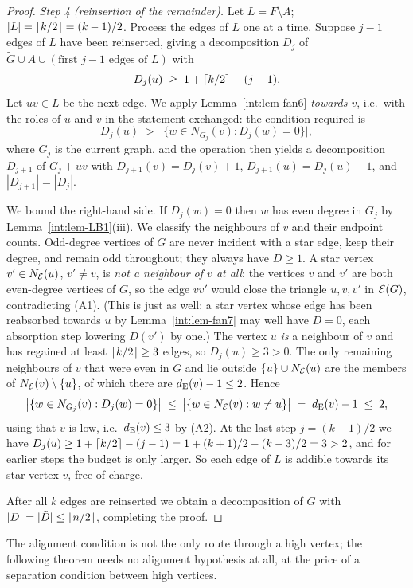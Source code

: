 \begin{proof}
\emph{Step 4 (reinsertion of the remainder).}
Let $L=F\setminus A$; $|L|=\left\lfloor k/2 \right\rfloor=(k-1)/2$. Process the edges of $L$
one at a time. Suppose $j-1$ edges of $L$ have been reinserted, giving a
decomposition $D_j$ of
$\tilde G\cup A\cup(\text{first } j-1 \text{ edges of } L)$ with
\[
D_j(u)\;\ge\;1+\left\lceil k/2 \right\rceil-(j-1).
\]
Let $uv\in L$ be the next edge. We apply Lemma~\ref{int:lem-fan6} \emph{towards
$v$}, i.e.\ with the roles of $u$ and $v$ in the statement exchanged: the
condition required is
\[
D_j(u)\;>\;\bigl|\{w\in N_{G_j}(v) : D_j(w)=0\}\bigr|,
\]
where $G_j$ is the current graph, and the operation then yields a
decomposition $D_{j+1}$ of $G_j+uv$ with $D_{j+1}(v)=D_j(v)+1$,
$D_{j+1}(u)=D_j(u)-1$, and $|D_{j+1}|=|D_j|$.

We bound the right-hand side. If $D_j(w)=0$ then $w$ has even degree in
$G_j$ by Lemma~\ref{int:lem-LB1}(iii). We classify the neighbours of $v$ and
their endpoint counts. Odd-degree vertices of $G$ are never incident with
a star edge, keep their degree, and remain odd throughout; they always
have $D\ge1$. A star vertex $v'\in N_{\mathcal{E}}(u)$, $v'\ne v$, is \emph{not a
neighbour of $v$ at all}: the vertices $v$ and $v'$ are both even-degree
vertices of $G$, so the edge $vv'$ would close the triangle $u,v,v'$ in
$\mathcal{E}(G)$, contradicting (A1). (This is just as well: a star vertex whose
edge has been reabsorbed towards $u$ by Lemma~\ref{int:lem-fan7} may well have
$D=0$, each absorption step lowering $D(v')$ by one.) The vertex $u$
\emph{is} a neighbour of $v$ and has regained at least $\left\lceil k/2 \right\rceil\ge3$
edges, so $D_j(u)\ge3>0$. The only remaining neighbours of $v$ that were
even in $G$ and lie outside $\{u\}\cup N_{\mathcal{E}}(u)$ are the members of
$N_{\mathcal{E}}(v)\setminus\{u\}$, of which there are $d_{\mathrm{E}}(v)-1\le2$. Hence
\[
\bigl|\{w\in N_{G_j}(v) : D_j(w)=0\}\bigr|
\;\le\; \bigl|\{w\in N_{\mathcal{E}}(v) : w\ne u\}\bigr|
\;=\;d_{\mathrm{E}}(v)-1\;\le\;2,
\]
using that $v$ is low, i.e.\ $d_{\mathrm{E}}(v)\le 3$ by (A2). At the last step
$j=(k-1)/2$ we have
$D_j(u)\ge 1+\left\lceil k/2 \right\rceil-(j-1)=1+(k+1)/2-(k-3)/2=3>2$, and for earlier steps
the budget is only larger. So each edge of $L$ is addible towards its star
vertex $v$, free of charge.

After all $k$ edges are reinserted we obtain a decomposition of $G$ with
$|D|=|\tilde D|\le\left\lfloor n/2 \right\rfloor$, completing the proof.
\end{proof}

The alignment condition is not the only route through a high vertex; the
following theorem needs no alignment hypothesis at all, at the price of a
separation condition between high vertices.

